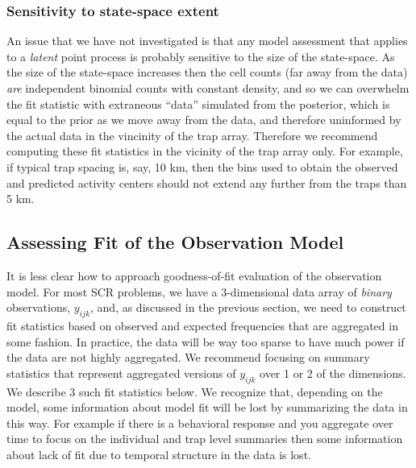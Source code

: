 \subsubsection{Sensitivity to state-space extent}

An issue that we have not investigated is that any model assessment
that applies to a {\it latent} point process is probably sensitive to
the size of the state-space. As the size of the state-space increases
then the cell counts (far away from the data) {\it are} independent
binomial counts with constant density, and so we can overwhelm the fit
statistic with extraneous ``data'' simulated from the posterior, which
is equal to the prior as we move away from the data, and therefore
uninformed by the actual data in the vincinity of the trap array.
Therefore we recommend computing these fit statistics in the vicinity
of the trap array only. For example, if typical trap spacing is, say,
10 km, then the bins used to obtain the observed and predicted
activity centers should not extend any further from the traps than 5
km.







\subsection{Assessing  Fit of the Observation Model}
\label{gof.sec.obsfit}

It is less clear how to approach goodness-of-fit evaluation of the
observation model.  For most SCR problems, we have a 3-dimensional
data array of {\it binary} observations, $y_{ijk}$, and, as discussed
in the previous section, we need to construct fit statistics based on
observed and expected frequencies that are aggregated in some fashion.
In practice, the data will be way too sparse to have much power if the
data are not highly aggregated. We recommend focusing on summary
statistics that represent aggregated versions of $y_{ijk}$ over 1 or 2
of the dimensions. We describe 3 such fit statistics below.  We
recognize that, depending on the model, some information about model
fit will be lost by summarizing the data in this way. For example if
there is a behavioral response and you aggregate over time to focus on
the individual and trap level summaries then some information about
lack of fit due to temporal structure in the data is lost.



